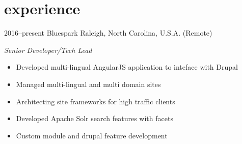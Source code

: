 \documentclass[]{friggeri-cv} %
\begin{document}

\section{experience}

\begin{entrylist}

\entry
{2016--present}
{Bluespark}
{Raleigh, North Carolina, U.S.A. (Remote)}
{\emph{Senior Developer/Tech Lead}
\begin{itemize}
\item Developed multi-lingual AngularJS application to inteface with Drupal
\item Managed multi-lingual and multi domain sites
\item Architecting site frameworks for high traffic clients
\item Developed Apache Solr search features with facets
\item Custom module and drupal feature development
\end{itemize}}


\end{entrylist}
\end{document}
